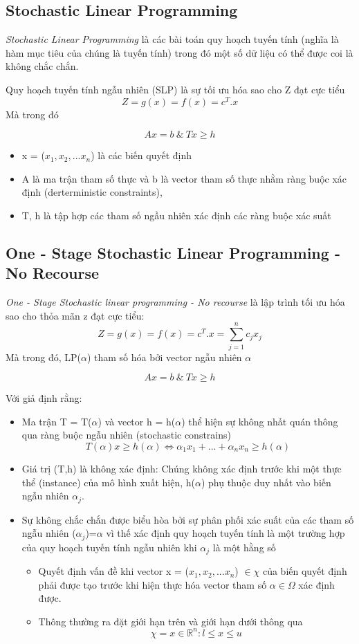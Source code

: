 \documentclass[a4paper]{article}
\begin{document}
\subsection{Stochastic Linear Programming}
{\textit{Stochastic Linear Programming} là các bài toán quy hoạch tuyến tính (nghĩa là hàm mục tiêu của chúng là tuyến tính) trong đó một số dữ liệu có thể được coi là không chắc chắn.}

{Quy hoạch tuyến tính ngẫu nhiên (SLP) là sự tối ưu hóa sao cho Z đạt cực tiểu}
\[ Z = g(x) = f(x) = c^T . x \]
{Mà trong đó}

\[ A x = b  \ \& \   T x \geqslant h \]
\begin{itemize}
    \item x = ($x_1, x_2,...x_n$) là các biến quyết định
    \item A là ma trận tham số thực và b là vector tham số thực nhằm ràng buộc xác định (derterministic constraints), 
    \item  T, h là tập hợp các tham số ngầu nhiên xác định các ràng buộc xác suất 
\end{itemize}
\subsection{One - Stage Stochastic Linear Programming - No Recourse}
{\textit{One - Stage Stochastic linear programming - No recourse} là lập trình tối ưu hóa sao cho thỏa mãn z đạt cực tiểu:}
\[ Z = g(x) = f(x) = c^T . x=\sum_{j=1}^nc_jx_j \]
{Mà trong đó, LP($\alpha$) tham số hóa bởi vector ngẫu nhiên $\alpha$}

\[ A x = b  \ \& \   T x \geqslant h \]

{Với giả định rằng:}
\begin{itemize}
    \item Ma trận T = T($\alpha$) và vector h = h($\alpha$) thể hiện sự không nhất quán thông qua ràng buộc ngẫu nhiên (stochastic constrains)
    \[T(\alpha) x \geqslant h(\alpha) \iff \alpha_1 x_1 + ... + \alpha_n x_n \geqslant h(\alpha)\]
    \item Giá trị (T,h) là không xác định: Chúng không xác định trước khi một thực thể (instance) của mô hình xuất hiện, h($\alpha$) phụ thuộc duy nhất vào biến ngẫu nhiên $\alpha_j$.
    \item Sự không chắc chắn được biểu hòa bởi sự phân phối xác suất của các tham số ngẫu nhiên ($\alpha_j$)=$\alpha$ vì thế xác định quy hoạch tuyến tính là một trường hợp của quy hoạch tuyến tính ngẫu nhiên khi $\alpha_j$ là một hằng số
    \begin{itemize}
        \item Quyết định vấn đề khi vector x = ($x_1, x_2,...x_n$) $\in \chi$ của biến quyết định phải được tạo trước khi hiện thực hóa vector tham số $\alpha \in \Omega$ xác định được.
        \item Thông thường ra đặt giới hạn trên và giới hạn dưới thông qua 
        \[\chi = x \in \mathbb{R}^n: l \leqslant x \leqslant u \]
    \end{itemize}
\end{itemize}
\end{document}
